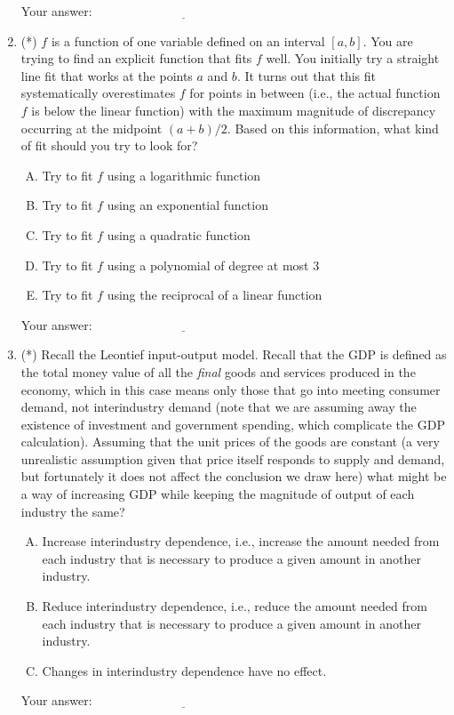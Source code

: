 \documentclass[10pt]{amsart}
\begin{document}
\begin{enumerate}
  \vspace{0.1in}
  Your answer: $\underline{\qquad\qquad\qquad\qquad\qquad\qquad\qquad}$
  \vspace{0.1in}

\item (*) $f$ is a function of one variable defined on an interval
  $[a,b]$. You are trying to find an explicit function that fits
  $f$ well. You initially try a straight line fit that works at the points
  $a$ and $b$. It turns out that this fit systematically overestimates
  $f$ for points in between (i.e., the actual function $f$ is below
  the linear function) with the maximum magnitude of discrepancy
  occurring at the midpoint $(a + b)/2$. Based on this information,
  what kind of fit should you try to look for?

  \begin{enumerate}[(A)]
  \item Try to fit $f$ using a logarithmic function
  \item Try to fit $f$ using an exponential function
  \item Try to fit $f$ using a quadratic function
  \item Try to fit $f$ using a polynomial of degree at most $3$
  \item Try to fit $f$ using the reciprocal of a linear function
  \end{enumerate}

  \vspace{0.1in}
  Your answer: $\underline{\qquad\qquad\qquad\qquad\qquad\qquad\qquad}$
  \vspace{0.1in}

\item (*) Recall the Leontief input-output model. Recall that the GDP is
  defined as the total money value of all the {\em final} goods and
  services produced in the economy, which in this case means only
  those that go into meeting consumer demand, not interindustry demand
  (note that we are assuming away the existence of investment and
  government spending, which complicate the GDP calculation). Assuming
  that the unit prices of the goods are constant (a very unrealistic
  assumption given that price itself responds to supply and demand,
  but fortunately it does not affect the conclusion we draw here) what
  might be a way of increasing GDP while keeping the magnitude of
  output of each industry the same?

  \begin{enumerate}[(A)]
  \item Increase interindustry dependence, i.e., increase the amount
    needed from each industry that is necessary to produce a given
    amount in another industry.
  \item Reduce interindustry dependence, i.e., reduce the amount
    needed from each industry that is necessary to produce a given
    amount in another industry.
  \item Changes in interindustry dependence have no effect.
  \end{enumerate}

  \vspace{0.1in}
  Your answer: $\underline{\qquad\qquad\qquad\qquad\qquad\qquad\qquad}$
  \vspace{0.1in}

\end{enumerate}
\end{document}

